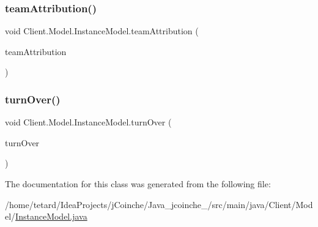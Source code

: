\mbox{\label{classClient_1_1Model_1_1InstanceModel_a36b2da19e784f1822d27b2803a0e3f2e}} 
\subsubsection{\texorpdfstring{team\+Attribution()}{teamAttribution()}}
{\footnotesize\ttfamily void Client.\+Model.\+Instance\+Model.\+team\+Attribution (\begin{DoxyParamCaption}\item[{\mbox{\hyperlink{classCommon_1_1TeamAttribution}{Team\+Attribution}}}]{team\+Attribution }\end{DoxyParamCaption})\hspace{0.3cm}{\ttfamily [inline]}}

\mbox{\label{classClient_1_1Model_1_1InstanceModel_a5d3dbc02d71df092c92de89e94ba3fff}} 
\subsubsection{\texorpdfstring{turn\+Over()}{turnOver()}}
{\footnotesize\ttfamily void Client.\+Model.\+Instance\+Model.\+turn\+Over (\begin{DoxyParamCaption}\item[{\mbox{\hyperlink{classCommon_1_1TurnOver}{Turn\+Over}}}]{turn\+Over }\end{DoxyParamCaption})\hspace{0.3cm}{\ttfamily [inline]}}



The documentation for this class was generated from the following file\+:\begin{DoxyCompactItemize}
\item 
/home/tetard/\+Idea\+Projects/j\+Coinche/\+Java\+\_\+jcoinche\+\_/src/main/java/\+Client/\+Model/\mbox{\hyperlink{InstanceModel_8java}{Instance\+Model.\+java}}\end{DoxyCompactItemize}
